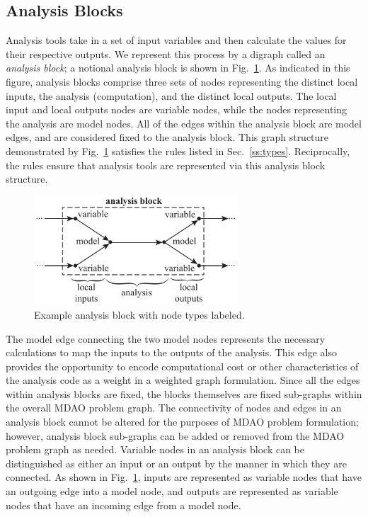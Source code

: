 \subsection{Analysis Blocks}
\label{ss:analysis blocks}
Analysis tools take in a set of input variables and then calculate 
the values for their respective outputs. We represent this process
by a digraph called an \emph{analysis block}; a notional analysis block is shown in Fig.~\ref{f:analysis block}. 
As indicated in this figure, analysis blocks comprise three sets of nodes representing the distinct local inputs, the analysis (computation), and the distinct local outputs. The local input and local outputs nodes are variable nodes, while the nodes representing the analysis are model nodes. All of the edges within the analysis block are model edges, and are considered fixed to the analysis block. This graph structure demonstrated by Fig.~\ref{f:analysis block} satisfies the rules listed in Sec.~\ref{ss:types}. Reciprocally, the rules ensure that analysis tools are represented via this analysis block structure.
\begin{figure}[htb]
    \begin{center}
    \includegraphics[width=3.0in]{images/analysis_block}
    \end{center}
    \vspace{-10pt}
\caption{Example analysis block with node types labeled.}
\label{f:analysis block}
\end{figure}

The model edge connecting the two model nodes represents the necessary calculations to map the inputs to the outputs of the analysis. 
This edge also provides the opportunity to encode computational cost or other characteristics of the analysis code as a weight in a weighted graph formulation. 
Since all the edges within analysis blocks are fixed, the blocks themselves are fixed sub-graphs within the overall MDAO problem graph. 
The connectivity of nodes and edges in an analysis block cannot be altered for the purposes of MDAO problem formulation; 
however, analysis block sub-graphs can be added or removed from the MDAO problem graph as needed.
Variable nodes in an analysis block can be distinguished as either an input or an output by the manner in which they are connected. 
As shown in Fig.~\ref{f:analysis block}, inputs are represented as variable nodes that have an outgoing edge into a model node, and outputs are represented as variable nodes that have an incoming edge from a model node. 

